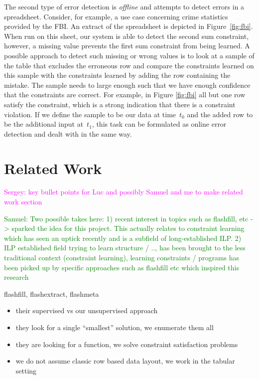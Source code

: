 \documentclass{IEEEtran}
\newcommand{\sergey}[1]{\textcolor{magenta}{{\sc Sergey:} #1}\xspace}
\newcommand{\samuel}[1]{\textcolor{green}{{\sc Samuel:} #1}\xspace}
\theoremstyle{definition}
\begin{document}
The second type of error detection is \textit{offline} and attempts to detect errors in a spreadsheet.
Consider, for example, a use case concerning crime statistics provided by the FBI.
An extract of the spreadsheet is depicted in Figure~\ref{fig:fbi}.
When run on this sheet, our system is able to detect the second sum constraint, however, a missing value prevents the first sum constraint from being learned.
A possible approach to detect such missing or wrong values is to look at a sample of the table that excludes the erroneous row and compare the constraints learned on this sample with the constraints learned by adding the row containing the mistake.
The sample needs to large enough such that we have enough confidence that the constraints are correct. For example, in Figure \ref{fig:fbi} all but one row satisfy the constraint, which is a strong indication that there is a constraint violation.
If we define the sample to be our data at time~$t_0$ and the added row to be the additional input at~$t_1$, this task can be formulated as online error detection and dealt with in the same way.

\section{Related Work}\label{sec:related_work}
\sergey{key bullet points for Luc and possibly Samuel and me to make related work section}

\samuel{Two possible takes here: 1) recent interest in topics such as flashfill, etc -> sparked the idea for this project. This actually relates to constraint learning which has seen an uptick recently and is a subfield of long-established ILP. 2) ILP established field trying to learn structure / .., has been brought to the less traditional context (constraint learning), learning constraints / programs has been picked up by specific approaches such as flashfill etc which inspired this research}

flashfill, flashextract, flashmeta \cite{flashfill,flashextract,flashmeta}
\begin{itemize}
  \item their supervised vs our unsupervised approach
  \item they look for a single ``smallest'' solution, we enumerate them all
  \item they are looking for a function, we solve constraint satisfaction problems
  \item we do not assume classic row based data layout, we work in the tabular setting
\end{itemize}
\end{document}
